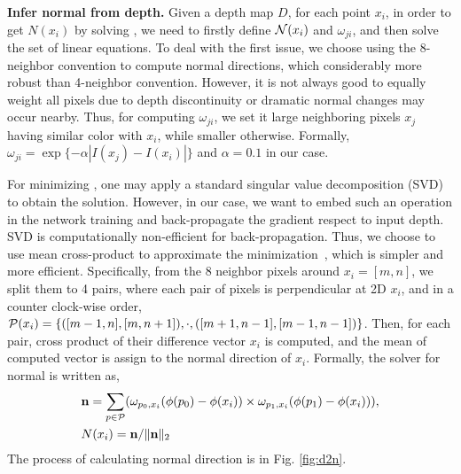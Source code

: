 \textbf{Infer normal from depth.} 
\label{chap:d2n}
Given a depth map $D$, for each point $x_i$, in order to get $N(x_i)$ by solving , we need to firstly define ${\mathcal N}(x_i)$ and $\omega_{ji}$, and then solve the set of linear equations. To deal with the first issue, we choose using the 8-neighbor convention to compute normal directions, which considerably more robust than 4-neighbor convention. 
However, it is not always good to equally weight all pixels due to depth discontinuity or dramatic normal changes may occur nearby. Thus, for computing $\omega_{ji}$, we set it large neighboring pixels $x_j$ having similar color with $x_i$, while smaller otherwise. Formally, $\omega_{ji} = \exp\{-\alpha|I(x_j) - I(x_i)|\}$ and $\alpha = 0.1$ in our case. 

For minimizing , one may apply a standard singular value decomposition (SVD) to obtain the solution. However, in our case, we want to embed such an operation in the network training and back-propagate the gradient respect to input depth. SVD is computationally non-efficient for back-propagation. Thus, we choose to use mean cross-product to approximate the minimization~\cite{jia2006using}, which is simpler and more efficient. 
Specifically, from the 8 neighbor pixels around $x_i = [m, n]$, we split them to 4 pairs, where each pair of pixels is perpendicular at 2D \wrt $x_i$, and in a counter clock-wise order, \ie ${\mathcal P}(x_i) = \{([m-1, n], [m, n+1]), \cdot, ([m+1, n-1], [m-1, n-1])\}$. 
Then, for each pair, cross product of their difference vector \wrt $x_i$ is computed, and the mean of computed vector is assign to the normal direction of $x_i$. Formally, the solver for normal is written as, 
\begin{align}
\label{eq:cross}
&{\mathbf n} = \sum_{p\in{\mathcal P}}(\omega_{p_{0}, x_i}(\phi(p_{0}) - \phi(x_i)) \times \omega_{p_{1}, x_i}(\phi(p_{1}) - \phi(x_i))), \nonumber \\
&N(x_i) = {\mathbf n} / \|{\mathbf n}\|_2
\end{align}
The process of calculating normal direction is in Fig. \ref{fig:d2n}. 


